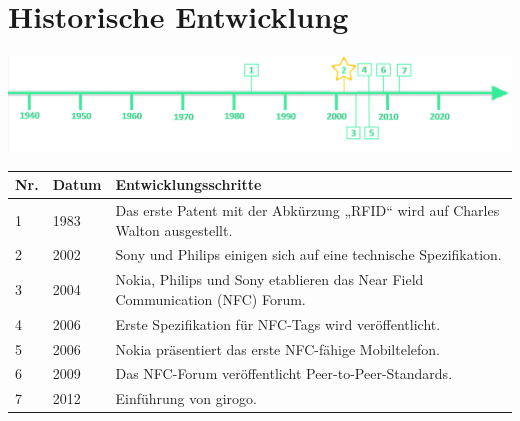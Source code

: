 \section*{Historische Entwicklung}
\includegraphics[width=\textwidth]{Kapitel/NFC/Grafiken/Zeitstrahl2}
\par
\noindent
{}
\begin{tabular}{p{0.5 cm}p{1.5 cm}p{15.55 cm}}
	\hline
	Nr. & Datum & Entwicklungsschritte~\cite{nfc.1}\\
	\hline
	1 & 1983 & Das erste Patent mit der Abkürzung „RFID“ wird auf Charles Walton ausgestellt.\\
	\hline
	2 & 2002 & Sony und Philips einigen sich auf eine technische Spezifikation.\\
	\hline
	3 & 2004 & Nokia, Philips und Sony etablieren das Near Field Communication (NFC) Forum.\\
	\hline
	4 & 2006 & Erste Spezifikation für NFC-Tags wird veröffentlicht.\\
	\hline
	5 & 2006 & Nokia präsentiert das erste NFC-fähige Mobiltelefon.\\
	\hline
	6 & 2009 & Das NFC-Forum veröffentlicht Peer-to-Peer-Standards.\\
	\hline
	7 & 2012 & Einführung von girogo.\\
	\hline
\end{tabular}
\par
